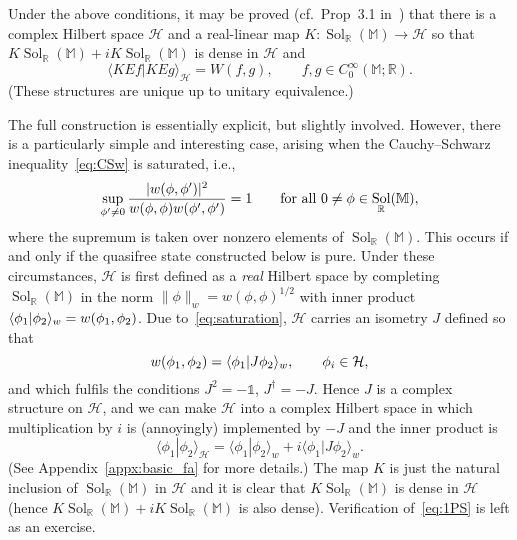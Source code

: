 \documentclass[12pt,a4paper]{article}
\let\Re\relax
\let\Im\relax
\DeclareMathOperator{\Re}{Re}
\DeclareMathOperator{\Im}{Im}
\newcommand{\1}{\mathds{1}}                         %
\newcommand{\RR}{\mathbb{R}}           %
\newcommand{\MM}{\mathbb{M}}
\newcommand{\HH}{{\mathcal{H}}}
\newcommand{\II}{{\mathbb{1}}}
\newcommand{\CoinX}[1]{C_0^\infty(#1)}
\newcommand{\ip}[2]{\langle #1|#2\rangle}
\DeclareMathOperator{\Sol}{Sol}
\begin{document}
Under the above conditions, it may be proved (cf.~Prop~3.1 in~\cite{KayWald:1991}) that there is a complex Hilbert space $\HH$ and a real-linear map $K:\Sol_\RR(\MM)\to\HH$
so that $K\Sol_\RR(\MM)+iK\Sol_\RR(\MM)$ is dense in $\HH$ and
\begin{equation}\label{eq:1PS}
\ip{KEf}{KEg}_\HH = W(f,g),\qquad f,g\in\CoinX{\MM;\RR}.
\end{equation}
(These structures are unique up to unitary equivalence.)

The full construction is essentially explicit, but slightly involved. However, there is a particularly simple and interesting case, arising when the Cauchy--Schwarz inequality~\eqref{eq:CSw} is saturated, i.e.,
\begin{equation}\label{eq:saturation}
\sup_{\phi'\neq 0}\frac{|\Im w(\phi,\phi')|^2}{w(\phi,\phi)w(\phi',\phi')} = 1 \qquad\text{for all $0\neq \phi\in\Sol_{\RR}(\MM)$},
\end{equation}
where the supremum is taken over nonzero elements of $\Sol_\RR(\MM)$. This occurs if and only if the quasifree state constructed below is pure.
Under these circumstances, 
$\HH$ is first defined as a \emph{real} Hilbert space by completing $\Sol_\RR(\MM)$ in the norm $\|\phi\|_w=w(\phi,\phi)^{1/2}$ with inner product
$\ip{\phi_1}{\phi_2}_w=\Re w(\phi_1,\phi_2)$. 
Due to~\eqref{eq:saturation}, $\HH$ carries an isometry $J$ defined so that
\[
\Im w(\phi_1,\phi_2) = \ip{\phi_1}{J\phi_2}_w, \qquad \phi_i\in \HH,
\]
and which fulfils the conditions $J^2=-\II$, $J^\dagger =-J$. Hence $J$ is a complex structure on $\HH$, and we can make $\HH$ into a complex Hilbert space in which multiplication by $i$ is
(annoyingly) implemented by $-J$ and the inner product is
\[
\ip{\phi_1}{\phi_2}_\HH = \ip{\phi_1}{\phi_2}_w + i \ip{\phi_1}{J\phi_2}_w.
\] 
(See Appendix~\ref{appx:basic_fa} for more details.)
The map $K$ is just the natural inclusion of $\Sol_\RR(\MM)$ in $\HH$ and it is clear that $K\Sol_\RR(\MM)$ is dense in $\HH$ (hence $K\Sol_\RR(\MM)+iK\Sol_\RR(\MM)$ is also dense).
Verification of~\eqref{eq:1PS} is left as an exercise.  
\end{document}
